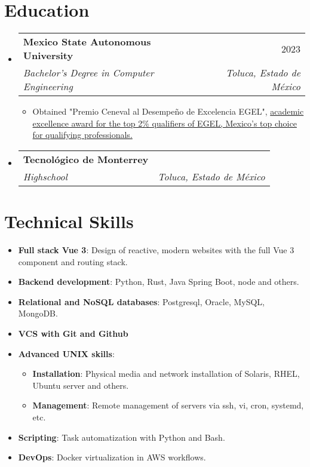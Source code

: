 \documentclass[letterpaper,11pt]{article}
\makeatletter
\newcommand{\resumeItem}[2]{
  \item\small{
    \textbf{#1}{: #2 \vspace{-2pt}}
  }
}
\newcommand{\resumeItemAtom}[1]{
  \item\small{#1}
}
\newcommand{\resumeSubheading}[4]{
  \vspace{-1pt}\item
    \begin{tabular*}{0.97\textwidth}[t]{l@{\extracolsep{\fill}}r}
      \textbf{#1} & #2 \\
      \textit{\small#3} & \textit{\small #4} \\
    \end{tabular*}\vspace{-5pt}
}
\newcommand{\resumeSubItem}[2]{\resumeItem{#1}{#2}\vspace{-4pt}}
\newcommand{\resumeSubItemAtom}[1]{\resumeItemAtom{#1}\vspace{-4pt}}
\newcommand{\resumeSubHeadingListStart}{\begin{itemize}[leftmargin=*]}
\newcommand{\resumeSubHeadingListEnd}{\end{itemize}}
\newcommand{\resumeItemListStart}{\begin{itemize}}
\newcommand{\resumeItemListEnd}{\end{itemize}\vspace{-5pt}}
\makeatother
\begin{document}
\section{Education}
\resumeSubHeadingListStart
\resumeSubheading
{Mexico State Autonomous University}{2023}
{Bachelor's Degree in Computer Engineering}{Toluca, Estado de México}
    \resumeItemListStart
    \resumeItemAtom{Obtained "Premio Ceneval al Desempeño de Excelencia EGEL", \href{https://reconocimiento.ceneval.edu.mx/busqueda-de-reconocimientos-2/?resultId=37772}{academic excellence award for the top 2\% qualifiers of EGEL, Mexico's top choice for qualifying professionals.}}
    \resumeItemListEnd
\resumeSubheading
{Tecnológico de Monterrey}{}
{Highschool}{Toluca, Estado de México}
\resumeSubHeadingListEnd
\section{Technical Skills}
\resumeSubHeadingListStart
\resumeSubItem{Full stack Vue 3}{Design of reactive, modern websites
with the full Vue 3 component and routing stack.}
\resumeSubItem{Backend development}{Python, Rust, Java Spring Boot, node and others.}
\resumeSubItem{Relational and NoSQL databases}{Postgresql, Oracle, MySQL, MongoDB.}
\resumeSubItemAtom{\textbf{VCS with Git and Github}}
\resumeSubItem{Advanced UNIX skills}{}
    \resumeItemListStart
    \resumeItem{Installation}{Physical media and network installation of Solaris, RHEL, Ubuntu server and others.}
    \resumeItem{Management}{Remote management of servers via ssh, vi, cron, systemd, etc.}
    \resumeItemListEnd
\resumeSubItem{Scripting}{Task automatization with Python and Bash.}
\resumeSubItem{DevOps}{Docker virtualization in AWS workflows.}
\resumeSubHeadingListEnd

\end{document}
